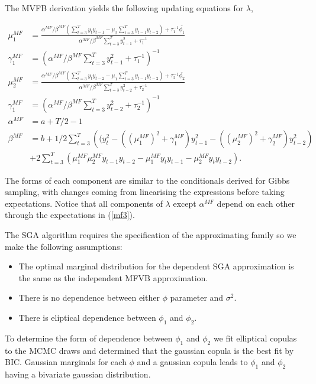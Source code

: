 \documentclass{article}\usepackage[]{graphicx}\usepackage[]{color}
\numberwithin{equation}{section}
\begin{document}
The MVFB derivation yields the following updating equations for $\lambda$,

\begin{align}
\mu_1^{MF} &= \frac{\alpha^{MF}/\beta^{MF} (\sum_{t=3}^{T} y_t y_{t-1} - \mu_2 \sum_{t=3}^{T} y_{t-1} y_{t-2}) + \tau_1^{-1} \bar{\phi_1}}{\alpha^{MF}/\beta^{MF} \sum_{t=3}^{T} y_{t-1}^2  +  \tau_1^{-1}} \nonumber \\
\gamma_1^{MF} &= \left(\alpha^{MF}/\beta^{MF} \sum_{t=3}^{T} y_{t-1}^2  +  \tau_1^{-1} \right)^{-1} \nonumber \\
\mu_2^{MF} &= \frac{\alpha^{MF}/\beta^{MF} (\sum_{t=3}^{T} y_t y_{t-2} - \mu_1 \sum_{t=3}^{T} y_{t-1} y_{t-2}) + \tau_2^{-1} \bar{\phi_2}}{\alpha^{MF}/\beta^{MF} \sum_{t=3}^{T} y_{t-2}^2  +  \tau_2^{-1}} \nonumber \\
\gamma_1^{MF} &= \left(\alpha^{MF}/\beta^{MF} \sum_{t=3}^{T} y_{t-2}^2  +  \tau_2^{-1} \right)^{-1} \nonumber \\
\alpha^{MF} &=  a + T/2 - 1  \nonumber \\
\beta^{MF} &= b + 1/2 \sum_{t=3}^{T} \left((y_t^2 - ((\mu_1^{MF})^2 + \gamma^{MF}_1) y_{t-1}^2 - ((\mu_2^{MF})^2 + \gamma_2^{MF}) y_{t-2}^2\right) \nonumber \\
&+ 2 \sum_{t=3}^{T} \left(\mu^{MF}_1 \mu^{MF}_2 y_{t-1}y_{t-2} - \mu^{MF}_1 y_{t} y_{t-1} - \mu^{MF}_2 y_t y_{t-2}\right) \nonumber.
\end{align}

The forms of each component are similar to the conditionals derived for Gibbs sampling, with changes coming from linearising the expressions before taking expectations. Notice that all components of $\lambda$ except $\alpha^{MF}$ depend on each other through the expectations in (\ref{mf3}).

The SGA algorithm requires the specification of the approximating family so we make the following assumptions:
\begin{itemize}
\item The optimal marginal distribution for the dependent SGA approximation is the same as the independent MFVB approximation.
\item There is no dependence between either $\phi$ parameter and $\sigma^2$.
\item There is eliptical dependence between $\phi_1$ and $\phi_2$.
\end{itemize}

To determine the form of dependence between $\phi_1$ and $\phi_2$ we fit elliptical copulas to the MCMC draws and determined that the gaussian copula is the best fit by BIC. Gaussian marginals for each $\phi$ and a gaussian copula leads to $\phi_1$ and $\phi_2$ having a bivariate gaussian distribution.
\end{document}
